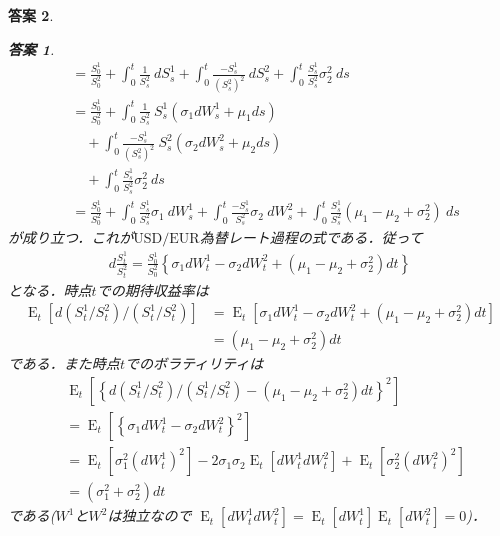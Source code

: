 \documentclass[11pt,a4paper]{jsarticle}
\theoremstyle{mystyle}
\newtheorem*{ans}{答案}
\begin{document}
\begin{ans}
\begin{ans}
\begin{align}
		&= \frac{S^{1}_{0}}{S^{2}_{0}} + \int_{0}^{t} \frac{1}{S^{2}_{s}}\ dS^{1}_{s}
		+ \int_{0}^{t} \frac{-S^{1}_{s}}{(S^{2}_{s})^{2}}\ dS^{2}_{s}
		+ \int_{0}^{t} \frac{S^{1}_{s}}{S^{2}_{s}} \sigma_{2}^{2}\ ds \\
		&= \frac{S^{1}_{0}}{S^{2}_{0}} + 
		\int_{0}^{t} \frac{1}{S^{2}_{s}}\ S^{1}_{s}(\sigma_{1}dW^{1}_{s} + \mu_{1}ds) \\
		&\quad+ \int_{0}^{t} \frac{-S^{1}_{s}}{(S^{2}_{s})^{2}}\ S^{2}_{s}(\sigma_{2}dW^{2}_{s} + \mu_{2}ds) \\
		&\quad+ \int_{0}^{t} \frac{S^{1}_{s}}{S^{2}_{s}} \sigma_{2}^{2}\ ds \\
		&= \frac{S^{1}_{0}}{S^{2}_{0}} + 
		\int_{0}^{t}\frac{S^{1}_{s}}{S^{2}_{s}}\sigma_{1}\ dW^{1}_{s}
		+ \int_{0}^{t}\frac{-S^{1}_{s}}{S^{2}_{s}}\sigma_{2}\ dW^{2}_{s}
		+ \int_{0}^{t}\frac{S^{1}_{s}}{S^{2}_{s}}(\mu_{1}-\mu_{2}+\sigma_{2}^{2})\ ds
	\end{align}
	が成り立つ．これが$\mbox{USD}/\mbox{EUR}$為替レート過程の式である．従って
	\begin{align}
		d\frac{S^{1}_{t}}{S^{2}_{t}} = 
		\frac{S^{1}_{0}}{S^{2}_{0}}\left\{\sigma_{1}dW^{1}_{t} - \sigma_{2}dW^{2}_{t} +
		(\mu_{1} - \mu_{2} + \sigma_{2}^{2})dt\right\}
	\end{align}
	となる．時点$t$での期待収益率は
	\begin{align}
		\operatorname{E}_{t}\left[d(S^{1}_{t}/S^{2}_{t})/(S^{1}_{t}/S^{2}_{t})\right]
		&= \operatorname{E}_{t}\left[\sigma_{1}dW^{1}_{t} - \sigma_{2}dW^{2}_{t} +
		(\mu_{1} - \mu_{2} + \sigma_{2}^{2})dt\right] \\
		&= (\mu_{1} - \mu_{2} + \sigma_{2}^{2})dt
	\end{align}
	である．また時点$t$でのボラティリティは
	\begin{align}
		&\operatorname{E}_{t}\left[\left\{d(S^{1}_{t}/S^{2}_{t})/(S^{1}_{t}/S^{2}_{t})
		- (\mu_{1} - \mu_{2} + \sigma_{2}^{2})dt\right\}^{2}\right] \\
		&= \operatorname{E}_{t}\left[\left\{\sigma_{1}dW^{1}_{t} - \sigma_{2}dW^{2}_{t} \right\}^{2}\right] \\
		&= \operatorname{E}_{t}\left[\sigma_{1}^{2}(dW^{1}_{t})^{2}\right]
		-2\sigma_{1}\sigma_{2} \operatorname{E}_{t}\left[dW^{1}_{t}dW^{2}_{t}\right]
		+ \operatorname{E}_{t}\left[\sigma_{2}^{2}(dW^{2}_{t})^{2}\right] \\
		&= (\sigma_{1}^{2} + \sigma_{2}^{2})dt
	\end{align}
	である($W^{1}$と$W^{2}$は独立なので
		$\operatorname{E}_{t}\left[dW^{1}_{t}dW^{2}_{t}\right]=
		\operatorname{E}_{t}\left[dW^{1}_{t}\right]
		\operatorname{E}_{t}\left[dW^{2}_{t}\right]=0$)．
\end{ans}

\end{ans}
\end{document}
